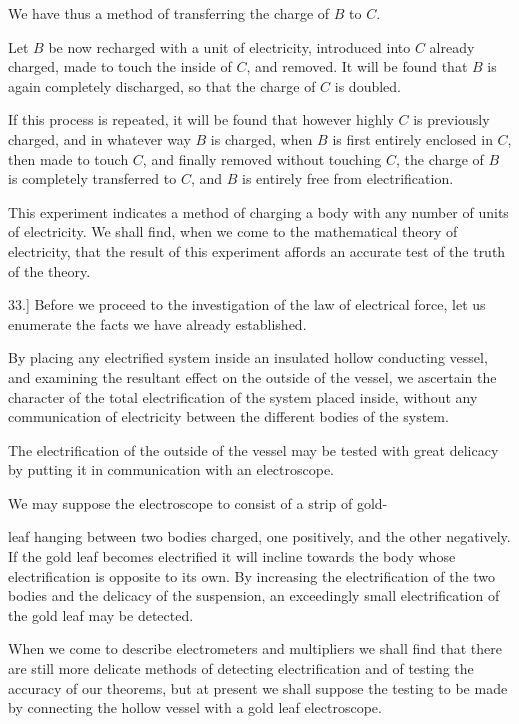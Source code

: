 \documentclass[11pt,a4paper]{article}
\begin{document}
We have thus a method of transferring the charge of \(B\) to \(C\).

Let \(B\) be now recharged with a unit of electricity, introduced into
\(C\) already charged, made to touch the inside of \(C\), and removed.
It will be found that \(B\) is again completely discharged, so that the
charge of \(C\) is doubled.

If this process is repeated, it will be found that however highly \(C\)
is previously charged, and in whatever way \(B\) is charged, when \(B\)
is first entirely enclosed in \(C\), then made to touch \(C\), and
finally removed without touching \(C\), the charge of \(B\) is
completely transferred to \(C\), and \(B\) is entirely free from
electrification.

This experiment indicates a method of charging a body with any number
of units of electricity. We shall find, when we come to the mathematical
theory of electricity, that the result of this experiment affords an
accurate test of the truth of the theory.

33.] Before we proceed to the investigation of the law of electrical
force, let us enumerate the facts we have already established.

By placing any electrified system inside an insulated hollow conducting
vessel, and examining the resultant effect on the outside of the vessel,
we ascertain the character of the total electrification of the system
placed inside, without any communication of electricity between the
different bodies of the system.

The electrification of the outside of the vessel may be tested with
great delicacy by putting it in communication with an electroscope.

We may suppose the electroscope to consist of a strip of gold-

\clearpage
\setcounter{footnote}{0}

leaf hanging between two bodies charged, one positively, and the other
negatively. If the gold leaf becomes electrified it will incline
towards the body whose electrification is opposite to its own. By
increasing the electrification of the two bodies and the delicacy of
the suspension, an exceedingly small electrification of the gold leaf
may be detected.

When we come to describe electrometers and multipliers we shall find
that there are still more delicate methods of detecting electrification
and of testing the accuracy of our theorems, but at present we shall
suppose the testing to be made by connecting the hollow vessel with a
gold leaf electroscope.
\end{document}

